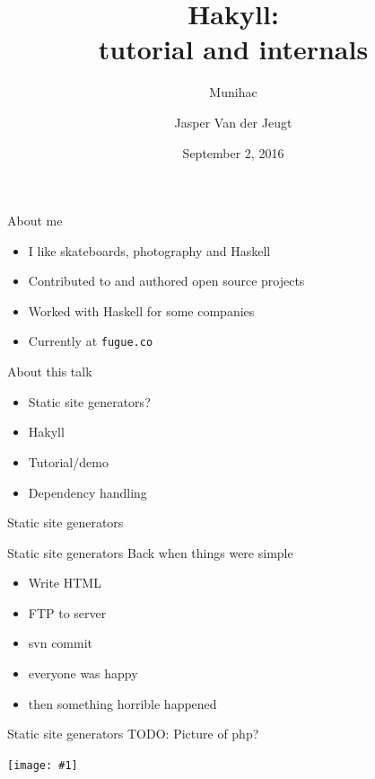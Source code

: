 \documentclass[20pt]{beamer}
\newcommand{\vspaced}{
    \vspace{5mm}
}
\newcommand{\imageframe}[1]{
    {
        \begin{frame}[plain]
        \begin{center}
        \texttt{[image: \#1]}
        \end{center}
        \end{frame}
    }
}
\newcommand{\chapterslide}[1]{
    {
        \begin{frame}[plain]
        \begin{center}
        \large{#1}
        \end{center}
        \end{frame}
    }
}
\newcommand{\code}[1]{
    \texttt{\small{#1}}
}
\begin{document}
\title{Hakyll: \\
tutorial and internals}
\subtitle{Munihac}
\author{Jasper Van der Jeugt}
\date{September 2, 2016}

\begin{frame}[plain]
    \titlepage
\end{frame}

\begin{frame}{About me}
    \begin{itemize}
    \item I like skateboards, photography and Haskell
    \item Contributed to and authored open source projects
    \item Worked with Haskell for some companies
    \item Currently at \code{fugue.co}
    \end{itemize}
\end{frame}

\begin{frame}{About this talk}
    \begin{itemize}
    \item Static site generators?
    \item Hakyll
    \item Tutorial/demo
    \item Dependency handling
    \end{itemize}
\end{frame}

\chapterslide{Static site generators}

\begin{frame}{Static site generators}
    Back when things were simple \\
    \vspaced
    \begin{itemize}
    \item Write HTML
    \item FTP to server
    \item svn commit
    \item everyone was happy
    \item then something horrible happened
    \end{itemize}
\end{frame}

\begin{frame}{Static site generators}
    TODO: Picture of php?
\end{frame}

\imageframe{images/cms.png}
\end{document}
